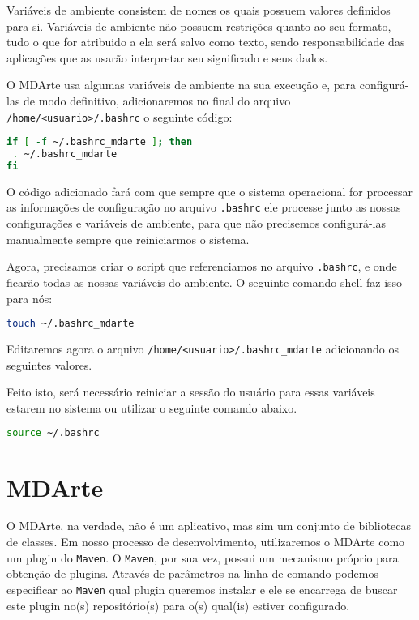 Variáveis de ambiente consistem de nomes os quais possuem valores definidos para
si. Variáveis de ambiente não possuem restrições quanto ao seu formato, tudo o
que for atribuido a ela será salvo como texto, sendo responsabilidade das
aplicações que as usarão interpretar seu significado e seus dados. 

O MDArte usa algumas variáveis de ambiente na sua execução e, para configurá-las
de modo definitivo, adicionaremos no final do arquivo
\texttt{/home/<usuario>/.bashrc} o seguinte código:

\begin{lstlisting}[language=bash]
if [ -f ~/.bashrc_mdarte ]; then
 . ~/.bashrc_mdarte
fi
\end{lstlisting}

O código adicionado fará com que sempre que o sistema operacional for processar
as informações de configuração no arquivo \texttt{.bashrc} ele processe junto
as nossas configurações e variáveis de ambiente, para que não precisemos
configurá-las manualmente sempre que reiniciarmos o sistema. 

Agora, precisamos criar o script que referenciamos no arquivo
\texttt{.bashrc}, e onde ficarão todas as nossas variáveis do ambiente. O
seguinte comando shell faz isso para nós:

\begin{lstlisting}[language=bash]
touch ~/.bashrc_mdarte
\end{lstlisting}
	
Editaremos agora o arquivo \texttt{/home/<usuario>/.bashrc\_mdarte} adicionando
os seguintes valores.

\begin{framed}
	
\end{framed}

Feito isto, será necessário reiniciar a sessão do usuário para essas variáveis
estarem no sistema ou utilizar o seguinte comando abaixo.

\begin{lstlisting}[language=bash]
source ~/.bashrc
\end{lstlisting}

\section{MDArte}

O MDArte, na verdade, não é um aplicativo, mas sim um conjunto de bibliotecas de
classes. Em nosso processo de desenvolvimento, utilizaremos o MDArte como um
plugin do \texttt{Maven}. O \texttt{Maven}, por sua vez, possui um mecanismo
próprio para obtenção de plugins. Através de parâmetros na linha de comando
podemos especificar ao \texttt{Maven} qual plugin queremos instalar e ele se
encarrega de buscar este plugin no(s) repositório(s) para o(s) qual(is) estiver
configurado.

